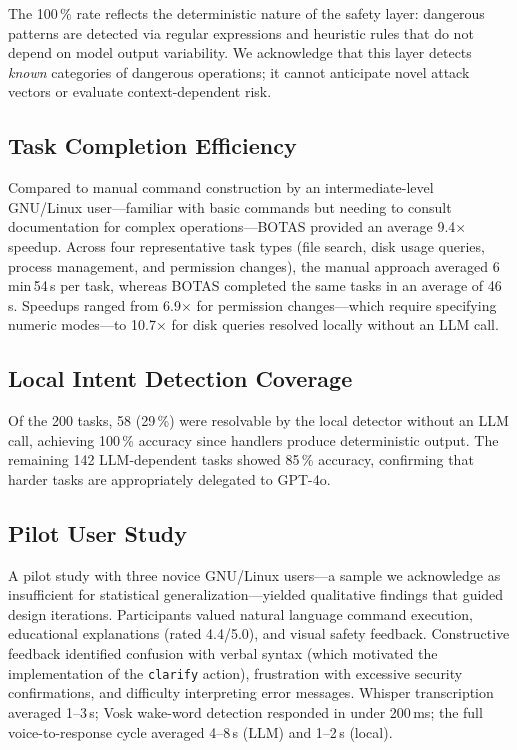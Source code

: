 \documentclass[10pt,a4paper]{article}
\begin{document}
The 100\,\% rate reflects the deterministic nature of the safety layer: dangerous patterns are detected via regular expressions and heuristic rules that do not depend on model output variability. We acknowledge that this layer detects \emph{known} categories of dangerous operations; it cannot anticipate novel attack vectors or evaluate context-dependent risk.

\subsection{Task Completion Efficiency}
\label{subsec:results-efficiency}

Compared to manual command construction by an intermediate-level GNU/Linux user---familiar with basic commands but needing to consult documentation for complex operations---BOTAS provided an average 9.4$\times$ speedup. Across four representative task types (file search, disk usage queries, process management, and permission changes), the manual approach averaged 6\,min\,54\,s per task, whereas BOTAS completed the same tasks in an average of 46\,s. Speedups ranged from 6.9$\times$ for permission changes---which require specifying numeric modes---to 10.7$\times$ for disk queries resolved locally without an LLM call.

\subsection{Local Intent Detection Coverage}
\label{subsec:results-local}

Of the 200 tasks, 58 (29\,\%) were resolvable by the local detector without an LLM call, achieving 100\,\% accuracy since handlers produce deterministic output. The remaining 142 LLM-dependent tasks showed 85\,\% accuracy, confirming that harder tasks are appropriately delegated to GPT-4o.

\subsection{Pilot User Study}
\label{subsec:results-usability}

A pilot study with three novice GNU/Linux users---a sample we acknowledge as insufficient for statistical generalization---yielded qualitative findings that guided design iterations. Participants valued natural language command execution, educational explanations (rated 4.4/5.0), and visual safety feedback. Constructive feedback identified confusion with verbal syntax (which motivated the implementation of the \texttt{clarify} action), frustration with excessive security confirmations, and difficulty interpreting error messages. Whisper transcription averaged 1--3\,s; Vosk wake-word detection responded in under 200\,ms; the full voice-to-response cycle averaged 4--8\,s (LLM) and 1--2\,s (local).
\end{document}
